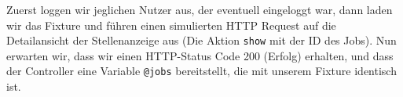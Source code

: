 \begin{ruby}[label=test/functional/jobs\_controller\_test.rb]
 

   
    
    \PY{o}{[}\PY{o}{]}  
      
    
        
    
     
      
\end{ruby}

\tddred
Zuerst loggen wir jeglichen Nutzer aus, der eventuell eingeloggt war, dann laden wir das Fixture und führen einen simulierten HTTP Request auf die Detailansicht der Stellenanzeige aus (Die Aktion \texttt{show} mit der ID des Jobs).
Nun erwarten wir, dass wir einen HTTP-Status Code 200 (Erfolg) erhalten, und dass der Controller eine Variable \texttt{@jobs} bereitstellt, die mit unserem Fixture identisch ist.


